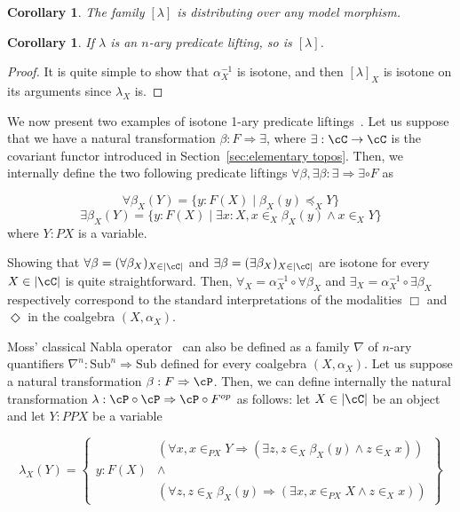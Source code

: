 \documentclass[preprint,3p,times]{elsarticle}
\newtheorem{corollary}[definition]{Corollary}
\newcommand{\Sub}{\mathrm{Sub}}
\begin{document}
\begin{corollary}
    The family $[\lambda]$ is distributing over any model morphism.
\end{corollary}

\begin{corollary}
    If $\lambda$ is an $n$-ary predicate lifting, so is $[\lambda]$.
\end{corollary}

\begin{proof}
    It is quite simple to show that $\alpha^{-1}_X$ is isotone, and then $[\lambda]_X$ is isotone on its arguments since $\lambda_X$ is.
\end{proof}

\medskip
We now present two examples of isotone 1-ary predicate liftings~\cite{Pat03}. Let us suppose that we have a natural transformation $\beta : F \Rightarrow \exists$, where \(\exists : \cC \to \cC\) is the covariant functor introduced in Section~\ref{sec:elementary topos}. Then, we internally define the two following predicate liftings $\forall \beta,\exists \beta : \exists \Rightarrow \exists \circ F$ as

\[\forall \beta_X(Y) = \{y:F(X) \mid \beta_X(y) \preceq_X Y\}\]
\[\exists \beta_X(Y) = \{y:F(X) \mid \exists x:X, x \in_X \beta_X(y) \wedge x \in_X Y\}\]
where $Y:PX$ is a variable.

Showing that $\forall \beta = (\forall \beta_X)_{X \in |\cC|}$ and $\exists \beta = (\exists \beta_X)_{X \in |\cC|}$ are isotone for every $X \in |\cC|$ is quite straightforward. Then, $\forall_X = \alpha^{-1}_X \circ \forall \beta_X$ and $\exists_X = \alpha^{-1}_X \circ \exists \beta_X$ respectively correspond to the standard interpretations of the modalities $\Box$ and $\Diamond$ in the coalgebra $(X,\alpha_X)$.

\medskip
Moss' classical Nabla operator~\cite{Moss99} can also be defined as a family $\nabla$ of $n$-ary quantifiers $\nabla^n : \Sub^n \Rightarrow \Sub$ defined for every coalgebra $(X,\alpha_X)$. Let us suppose a natural transformation $\beta : F \Rightarrow \cP$. Then, we can define internally the natural transformation $\lambda : \cP \circ \cP \Rightarrow \cP \circ F^{op}$ as follows: let $X \in |\cC|$ be an object and let $Y:PPX$ be a variable

$$\lambda_X(Y) = 
\left\{
    \begin{array}{l|c}
         & (\forall x, x \in_{PX} Y \Rightarrow (\exists z, z \in_X \beta_X(y) \wedge z \in_X x)) \\
   y:F(X)  & \wedge \\
         & (\forall z, z \in_X \beta_X(y) \Rightarrow (\exists x,  x \in_{PX} X \wedge z \in_X x))
    \end{array}
\right\}
$$
\end{document}
